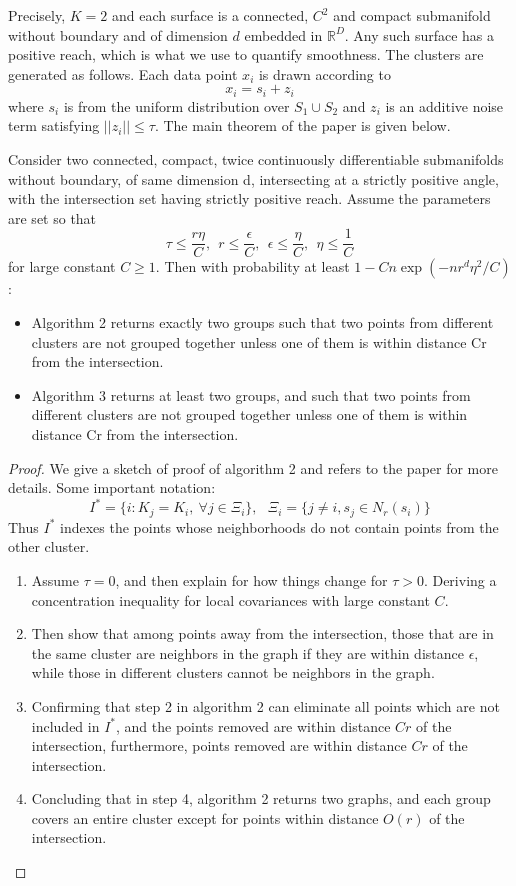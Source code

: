 \documentclass[twoside,11pt]{article}
\begin{document}
Precisely, $K=2$ and each surface is a connected, $C^2$ and compact submanifold without boundary
and of dimension $d$ embedded in $\mathbb R^D$. Any such surface has a positive reach, which is what
we use to quantify smoothness. The clusters are generated as follows. Each data point $x_i$
is drawn according to
$$
x_i = s_i + z_i
$$
where $s_i$ is from the uniform distribution over $S_1\cup S_2$ and $z_i$ is an additive noise
term satisfying $||z_i||\le \tau$. The main theorem of the paper is given below.
\begin{theorem}
Consider two connected, compact, twice continuously differentiable submanifolds
without boundary, of same dimension d, intersecting at a strictly positive angle, with
the intersection set having strictly positive reach. Assume the parameters are set so that
$$
\tau\le \frac{r\eta}{C},\ \ r\le\frac{\epsilon}{C},\ \ \epsilon\le\frac{\eta}{C},\ \ \eta\le\frac{1}{C}
$$
for large constant $C\ge 1$. Then with probability
at least $1-Cn\exp(- nr^d\eta^2/C)$:
\begin{itemize}
\item Algorithm 2 returns exactly two groups such that two points from different clusters are
not grouped together unless one of them is within distance Cr from the intersection.
\item Algorithm 3 returns at least two groups, and such that two points from different clusters
are not grouped together unless one of them is within distance Cr from the intersection.
\end{itemize}
\end{theorem}

\begin{proof}
We give a sketch of proof of algorithm 2 and refers to the paper for more details. Some important notation:
$$
I^*=\{i: K_j=K_i,\ \forall j\in\Xi_i  \},\ \ \ \Xi_i=\{j\ne i, s_j\in N_r(s_i)   \}
$$
Thus $I^*$ indexes the points whose neighborhoods do not contain points from the other cluster.

\begin{enumerate}
\item Assume $\tau=0$, and then explain for how things change for $\tau>0$. Deriving a concentration inequality for local covariances with large constant $C$.
\item Then show that among points away from the intersection, those that are in the same cluster are neighbors in the graph if
they are within distance $\epsilon$, while those in different clusters cannot be neighbors in the graph.
\item Confirming that step 2 in algorithm 2 can eliminate all points which are not included in $I^*$, and  the points removed are within distance $Cr$ of the intersection, furthermore,  points removed are within distance $Cr$ of the intersection.
\item Concluding that in step 4, algorithm 2 returns two graphs, and each group covers an entire cluster except for points within distance $O(r)$ of the intersection.
\end{enumerate}
\end{proof}
\end{document}

